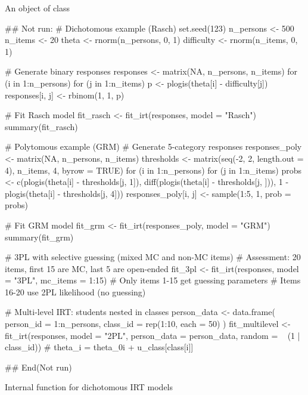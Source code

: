 \documentclass[a4paper]{book}
\begin{document}
%
\begin{Value}
An object of class 
\end{Value}
%
\begin{Examples}
\begin{ExampleCode}
## Not run: 
# Dichotomous example (Rasch)
set.seed(123)
n_persons <- 500
n_items <- 20
theta <- rnorm(n_persons, 0, 1)
difficulty <- rnorm(n_items, 0, 1)

# Generate binary responses
responses <- matrix(NA, n_persons, n_items)
for (i in 1:n_persons) {
  for (j in 1:n_items) {
    p <- plogis(theta[i] - difficulty[j])
    responses[i, j] <- rbinom(1, 1, p)
  }
}

# Fit Rasch model
fit_rasch <- fit_irt(responses, model = "Rasch")
summary(fit_rasch)

# Polytomous example (GRM)
# Generate 5-category responses
responses_poly <- matrix(NA, n_persons, n_items)
thresholds <- matrix(seq(-2, 2, length.out = 4), n_items, 4, byrow = TRUE)
for (i in 1:n_persons) {
  for (j in 1:n_items) {
    probs <- c(plogis(theta[i] - thresholds[j, 1]),
               diff(plogis(theta[i] - thresholds[j, ])),
               1 - plogis(theta[i] - thresholds[j, 4]))
    responses_poly[i, j] <- sample(1:5, 1, prob = probs)
  }
}

# Fit GRM model
fit_grm <- fit_irt(responses_poly, model = "GRM")
summary(fit_grm)

# 3PL with selective guessing (mixed MC and non-MC items)
# Assessment: 20 items, first 15 are MC, last 5 are open-ended
fit_3pl <- fit_irt(responses, model = "3PL", mc_items = 1:15)
# Only items 1-15 get guessing parameters
# Items 16-20 use 2PL likelihood (no guessing)

# Multi-level IRT: students nested in classes
person_data <- data.frame(
  person_id = 1:n_persons,
  class_id = rep(1:10, each = 50)
)
fit_multilevel <- fit_irt(responses, model = "2PL",
                           person_data = person_data,
                           random = ~ (1 | class_id))
# theta_i = theta_0i + u_class[class[i]]

## End(Not run)

\end{ExampleCode}
\end{Examples}
%
\begin{Description}
Internal function for dichotomous IRT models
\end{Description}
\end{document}
